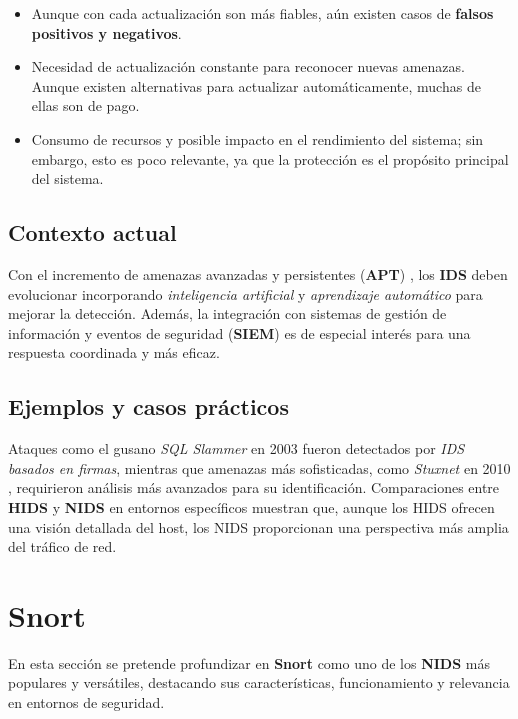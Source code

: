 \documentclass[12pt,a4paper]{report}
\begin{document}
\begin{itemize}
	\item Aunque con cada actualización son más fiables, aún existen casos de \textbf{falsos positivos y negativos}.
	\item Necesidad de actualización constante para reconocer nuevas amenazas. Aunque existen alternativas para actualizar automáticamente, muchas de ellas son de pago.
	\item Consumo de recursos y posible impacto en el rendimiento del sistema; sin embargo, esto es poco relevante, ya que la protección es el propósito principal del sistema.
\end{itemize}


\subsection{Contexto actual}

Con el incremento de amenazas avanzadas y persistentes (\textbf{APT}) \cite{cortes2017amenazas}, los \textbf{IDS} deben evolucionar incorporando \textit{inteligencia artificial} y \textit{aprendizaje automático} para mejorar la detección. Además, la integración con sistemas de gestión de información y eventos de seguridad (\textbf{SIEM}) es de especial interés para una respuesta coordinada y más eficaz.

\subsection{Ejemplos y casos prácticos}

Ataques como el gusano \textit{SQL Slammer} en 2003 \cite{travis2004analysis} fueron detectados por \textit{IDS basados en firmas}, mientras que amenazas más sofisticadas, como \textit{Stuxnet} en 2010 \cite{kerr2010stuxnet} \cite{al2018stuxnet}, requirieron análisis más avanzados para su identificación. Comparaciones entre \textbf{HIDS} y \textbf{NIDS} en entornos específicos muestran que, aunque los HIDS ofrecen una visión detallada del host, los NIDS proporcionan una perspectiva más amplia del tráfico de red.

\section{Snort}

En esta sección se pretende profundizar en \textbf{Snort} como uno de los \textbf{NIDS} más populares y versátiles, destacando sus características, funcionamiento y relevancia en entornos de seguridad.
\end{document}

